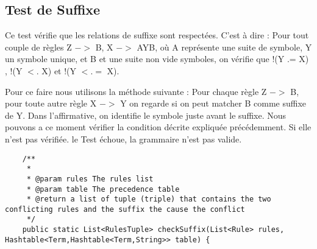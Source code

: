 	\subsection{Test de Suffixe}
		Ce test vérifie que les relations de suffixe sont respectées. C'est à dire :
		Pour tout couple de règles Z $->$ B, X $->$ AYB, où A représente une suite de symbole, Y un symbole unique,
		et B et une suite non vide symboles, on vérifie que !(Y .= X) , !(Y $<.$ X) et !(Y $<.=$ X).
		
		Pour ce faire nous utilisons la méthode suivante : 
		Pour chaque règle Z $->$ B, pour toute autre règle X $->$ Y on regarde si on peut matcher B comme suffixe de Y.
		Dans l'affirmative, on identifie le symbole juste avant le suffixe. Nous pouvons a ce moment vérifier la
		condition décrite expliquée précédemment. Si elle n'est pas vérifiée. le Test échoue, la grammaire n'est pas valide.


\begin{verbatim}
	/**
	 * 
	 * @param rules The rules list
	 * @param table The precedence table
	 * @return a list of tuple (triple) that contains the two conflicting rules and the suffix the cause the conflict
	 */
	public static List<RulesTuple> checkSuffix(List<Rule> rules, Hashtable<Term,Hashtable<Term,String>> table) {
\end{verbatim}
